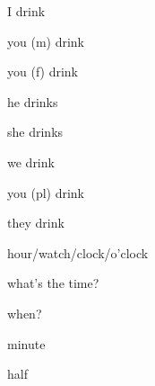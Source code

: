 

\begin{flashcard}{\LARGE I drink}
\LARGE {}
\end{flashcard}
\begin{flashcard}{\LARGE you (m) drink}
\LARGE {}
\end{flashcard}
\begin{flashcard}{\LARGE you (f) drink}
\LARGE {}
\end{flashcard}
\begin{flashcard}{\LARGE he drinks}
\LARGE {}
\end{flashcard}
\begin{flashcard}{\LARGE she drinks}
\LARGE {}
\end{flashcard}
\begin{flashcard}{\LARGE we drink}
\LARGE {}
\end{flashcard}
\begin{flashcard}{\LARGE you (pl) drink}
\LARGE {}
\end{flashcard}
\begin{flashcard}{\LARGE they drink}
\LARGE {}
\end{flashcard}
\begin{flashcard}{\LARGE hour/watch/clock/o'clock}
\LARGE {}
\end{flashcard}
\begin{flashcard}{\LARGE what's the time?}
\LARGE {}
\end{flashcard}
\begin{flashcard}{\LARGE when?}
\LARGE {}
\end{flashcard}
\begin{flashcard}{\LARGE minute}
\LARGE {}
\end{flashcard}
\begin{flashcard}{\LARGE half}
\LARGE {}
\end{flashcard}
